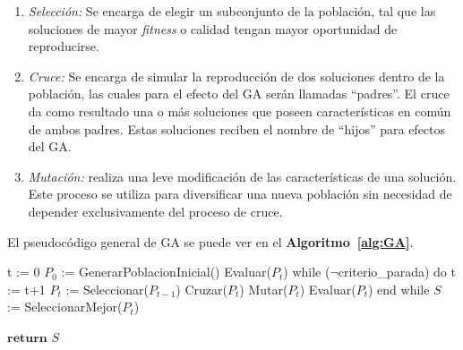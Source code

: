 \begin{enumerate}
 
\item\textit{Selección:} Se encarga de elegir un subconjunto de la población, tal que las soluciones de mayor \textit{fitness} o calidad tengan mayor oportunidad de reproducirse. 

\item\textit{Cruce:} Se encarga de simular la reproducción de dos soluciones dentro de la población, las cuales para el efecto del GA serán llamadas ``padres''. El cruce da como resultado una o más soluciones que poseen características en común de ambos padres. Estas soluciones reciben el nombre de ``hijos'' para efectos del GA.

\item\textit{Mutación:} realiza una leve modificación de las características de una solución. Este proceso se utiliza para diversificar una nueva población sin necesidad de depender exclusivamente del proceso de cruce. 

\end{enumerate}

El pseudocódigo general de GA se puede ver en el \textbf{Algoritmo~\ref{alg:GA}}.
 
\begin{code}[includerangemarker=false,frame=single,label=alg:GA,caption=Pseudocódigo de Algoritmo Genético,firstnumber=100, mathescape]
t := 0
$P_0$ := GenerarPoblacionInicial()
Evaluar($P_t$)
while ($\neg$criterio_parada) do
	t := t+1
	$P_t$ := Seleccionar($P_{t-1}$)
	Cruzar($P_{t}$)
	Mutar($P_t$)
	Evaluar($P_t$)	
end while
$S$ := SeleccionarMejor($P_t$)

$\textbf{return}$ $S$
\end{code}